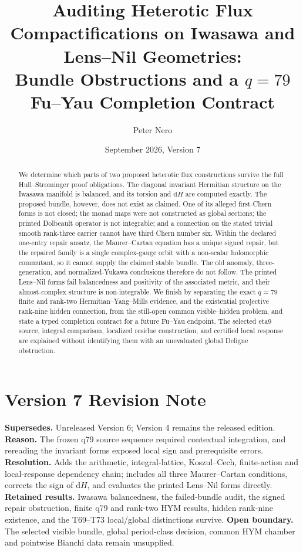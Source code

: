 \documentclass[11pt]{article}
\title{Auditing Heterotic Flux Compactifications on Iwasawa and
Lens--Nil Geometries:\\
Bundle Obstructions and a \(q=79\) Fu--Yau Completion Contract}
\author{Peter Nero}
\date{September 2026, Version 7}
\newcommand{\dd}{\mathrm{d}}
\theoremstyle{definition}
\theoremstyle{remark}
\begin{document}
\maketitle

\begin{abstract}
We determine which parts of two proposed heterotic flux constructions survive
the full Hull--Strominger proof obligations.  The diagonal invariant Hermitian
structure on the Iwasawa manifold is balanced, and its torsion and
\(\dd H\) are computed exactly.  The proposed bundle, however, does not exist
as claimed.  One of its alleged first-Chern forms is not closed; the monad maps
were not constructed as global sections; the printed Dolbeault operator is not
integrable; and a connection on the stated trivial smooth rank-three carrier
cannot have third Chern number six.  Within the declared one-entry repair
ansatz, the Maurer--Cartan equation has a unique signed repair, but the repaired
family is a single complex-gauge orbit with a non-scalar holomorphic
commutant, so it cannot supply the claimed stable bundle.  The old anomaly,
three-generation, and normalized-Yukawa conclusions therefore do not follow.
The printed Lens--Nil forms fail balancedness and positivity of the associated metric,
and their almost-complex structure is non-integrable.  We finish by separating the exact
\(q=79\) finite and rank-two Hermitian--Yang--Mills evidence, and the
existential projective rank-nine hidden connection, from the still-open
common visible--hidden problem, and state a typed completion contract for a
future Fu--Yau endpoint.  The selected eta9 source, integral comparison,
localized residue construction, and certified local response are explained
without identifying them with an unevaluated global Deligne obstruction.
\end{abstract}

\section*{Version 7 Revision Note}
\noindent\textbf{Supersedes.} Unreleased Version 6; Version 4 remains the
released edition. \textbf{Reason.} The frozen q79 source sequence required
contextual integration, and rereading the invariant forms exposed local
sign and prerequisite errors. \textbf{Resolution.} Adds the arithmetic,
integral-lattice, Koszul--Cech, finite-action and local-response dependency
chain; includes all three Maurer--Cartan conditions, corrects the sign of
\(\dd H\), and evaluates the printed Lens--Nil forms directly.
\textbf{Retained results.} Iwasawa balancedness, the failed-bundle audit,
the signed repair obstruction, finite q79 and rank-two HYM results, hidden
rank-nine existence, and the T69--T73 local/global distinctions survive.
\textbf{Open boundary.} The selected visible bundle, global period-class
decision, common HYM chamber and pointwise Bianchi data remain unsupplied.
\end{document}

